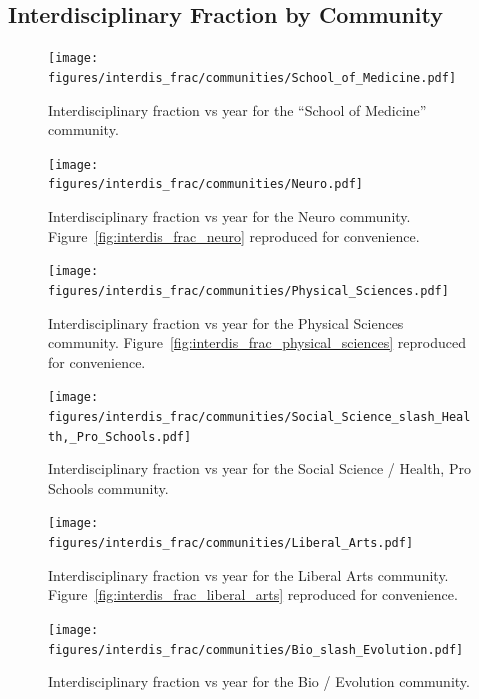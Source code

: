 \documentclass[notitlepage,aps,prd,nofootinbib]{revtex4-1}
\newcommand{\figures}{../outputs/plots}
\begin{document}
\begin{appendices}
\section{Interdisciplinary Fraction by Community}
\label{appendix:interdis_frac_community}

\begin{figure}[!htb]\centering
  \texttt{[image: \\figures/interdis\_frac/communities/School\_of\_Medicine.pdf]}
  \caption{Interdisciplinary fraction vs year for the ``School of Medicine'' community.}
\end{figure}

\begin{figure}[!htb]\centering
  \texttt{[image: \\figures/interdis\_frac/communities/Neuro.pdf]}
  \caption{Interdisciplinary fraction vs year for the Neuro community. Figure~\ref{fig:interdis_frac_neuro} reproduced for convenience.}
\end{figure}

\begin{figure}[!htb]\centering
  \texttt{[image: \\figures/interdis\_frac/communities/Physical\_Sciences.pdf]}
  \caption{Interdisciplinary fraction vs year for the Physical Sciences community. Figure~\ref{fig:interdis_frac_physical_sciences} reproduced for convenience.}
\end{figure}

\begin{figure}[!htb]\centering
  \texttt{[image: \\figures/interdis\_frac/communities/Social\_Science\_slash\_Health,\_Pro\_Schools.pdf]}
  \caption{Interdisciplinary fraction vs year for the Social Science / Health, Pro Schools community.}
\end{figure}

\begin{figure}[!htb]\centering
  \texttt{[image: \\figures/interdis\_frac/communities/Liberal\_Arts.pdf]}
  \caption{Interdisciplinary fraction vs year for the Liberal Arts community. Figure~\ref{fig:interdis_frac_liberal_arts} reproduced for convenience.}
\end{figure}

\begin{figure}[!htb]\centering
  \texttt{[image: \\figures/interdis\_frac/communities/Bio\_slash\_Evolution.pdf]}
  \caption{Interdisciplinary fraction vs year for the Bio / Evolution community.}
\end{figure}



\end{appendices}
\end{document}
